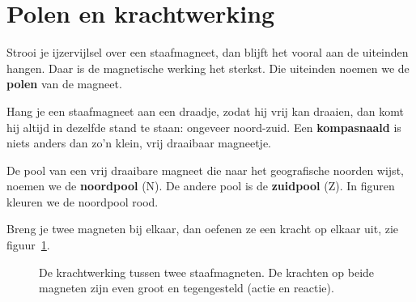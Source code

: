 \documentclass{ximera}
\begin{document}
\section{Polen en krachtwerking}\label{sec:polen}
Strooi je ijzervijlsel over een staafmagneet, dan blijft het vooral aan de uiteinden hangen. Daar is de magnetische werking het sterkst. Die uiteinden noemen we de \textbf{polen} van de magneet.

Hang je een staafmagneet aan een draadje, zodat hij vrij kan draaien, dan komt hij altijd in dezelfde stand te staan: ongeveer noord-zuid. Een \textbf{kompasnaald} is niets anders dan zo'n klein, vrij draaibaar magneetje.

\begin{definition}[foldable=true,title={Noordpool en zuidpool}]\nl
    De pool van een vrij draaibare magneet die naar het geografische noorden wijst, noemen we de \textbf{noordpool} (N). De andere pool is de \textbf{zuidpool} (Z). In figuren kleuren we de noordpool rood.
\end{definition}

Breng je twee magneten bij elkaar, dan oefenen ze een kracht op elkaar uit, zie figuur~\ref{fig:polen_kracht}.

\begin{figure}[ht!]
    \captionsetup{width=0.85\textwidth}
    \begin{center}
    \end{center}
    \caption{De krachtwerking tussen twee staafmagneten. De krachten op beide magneten zijn even groot en tegengesteld (actie en reactie).}
    \label{fig:polen_kracht}
\end{figure}
\end{document}
